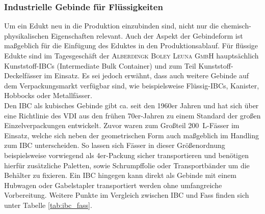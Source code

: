 \subsubsection{Industrielle Gebinde für Flüssigkeiten}
Um ein Edukt neu in die Produktion einzubinden sind, nicht nur die chemisch-physikalischen Eigenschaften relevant. Auch der Aspekt der Gebindeform ist maßgeblich für die Einfügung des Eduktes in den Produktionsablauf. Für flüssige Edukte sind im Tagesgeschäft der \textsc{Alberdingk Boley Leuna GmbH} hauptsächlich Kunststoff-IBCs (Intermediate Bulk Container) und zum Teil Kunststoff-Deckelfässer im Einsatz. Es sei jedoch erwähnt, dass auch weitere Gebinde auf dem Verpackungsmarkt verfügbar sind, wie beispielsweise Flüssig-IBCs, Kanister, Hobbocks oder Metallfässer.\\
Den IBC als kubisches Gebinde gibt ca. seit den 1960er Jahren  und hat sich über eine Richtlinie des VDI aus den frühen 70er-Jahren zu einem Standard der großen Einzelverpackungen entwickelt. Zuvor waren zum Großteil \SI{200}{\liter}-Fässer im Einsatz, welche sich neben der geometrischen Form auch maßgeblich im Handling zum IBC unterscheiden. \cite{neueverpackung.01.02.2022}
So lassen sich Fässer in dieser Größenordnung beispielsweise vorwiegend als 4er-Packung sicher transportieren und benötigen hierfür zusätzliche Paletten, sowie Schrumpffolie oder Transportbänder um die Behälter zu fixieren. Ein IBC hingegen kann direkt als Gebinde mit einem Hubwagen oder Gabelstapler transportiert werden ohne umfangreiche Vorbereitung. Weitere Punkte im Vergleich zwischen IBC und Fass finden sich unter Tabelle \ref{tab:ibc_fass}.


